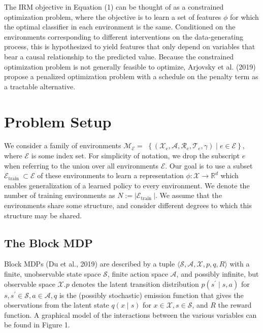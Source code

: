 \documentclass[10pt]{article}
\begin{document}
The IRM objective in Equation (1) can be thought of as a constrained optimization problem, where the objective is to learn a set of features $\phi$ for which the optimal classifier in each environment is the same. Conditioned on the environments corresponding to different interventions on the data-generating process, this is hypothesized to yield features that only depend on variables that bear a causal relationship to the predicted value. Because the constrained optimization problem is not generally feasible to optimize, Arjovsky et al. (2019) propose a penalized optimization problem with a schedule on the penalty term as a tractable alternative.

\section{Problem Setup}
We consider a family of environments $\mathcal{M}_{\mathcal{E}}=$ $\left\{\left(\mathcal{X}_{e}, \mathcal{A}, \mathcal{R}_{e}, \mathcal{T}_{e}, \gamma\right) \mid e \in \mathcal{E}\right\}$, where $\mathcal{E}$ is some index set. For simplicity of notation, we drop the subscript $e$ when referring to the union over all environments $\mathcal{E}$. Our goal is to use a subset $\mathcal{E}_{\text {train }} \subset \mathcal{E}$ of these environments to learn a representation $\phi: \mathcal{X} \rightarrow \mathbb{R}^{d}$ which enables generalization of a learned policy to every environment. We denote the number of training environments as $N:=\left|\mathcal{E}_{\text {train }}\right|$. We assume that the environments share some structure, and consider different degrees to which this structure may be shared.

\subsection{The Block MDP}
Block MDPs (Du et al., 2019) are described by a tuple $\langle\mathcal{S}, \mathcal{A}, \mathcal{X}, p, q, R\rangle$ with a finite, unobservable state space $\mathcal{S}$, finite action space $\mathcal{A}$, and possibly infinite, but observable space $\mathcal{X} . p$ denotes the latent transition distribution $p\left(s^{\prime} \mid s, a\right)$ for $s, s^{\prime} \in \mathcal{S}, a \in \mathcal{A}, q$ is the (possibly stochastic) emission function that gives the observations from the latent state $q(x \mid s)$ for $x \in \mathcal{X}, s \in \mathcal{S}$, and $R$ the reward function. A graphical model of the interactions between the various variables can be found in Figure 1.
\end{document}
